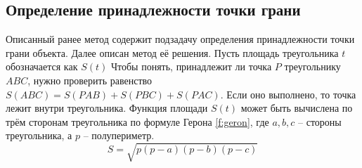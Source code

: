 {    \subsection{Определение принадлежности точки грани} {
        Описанный ранее метод содержит подзадачу определения
        принадлежности точки грани объекта.
        Далее описан метод её решения.
        Пусть площадь треугольника $t$ обозначается как $S(t)$
        Чтобы понять, принадлежит ли точка $P$ треугольнику $ABC$,
        нужно проверить равенство $S(ABC) = S(PAB) + S(PBC) + S(PAC)$.
        Если оно выполнено, то точка лежит внутри треугольника.
        Функция площади $S(t)$ может быть вычислена по трём сторонам
        треугольника по формуле Герона \ref{f:geron}, где $a, b, c$ -- стороны треугольника, а $p$ -- полупериметр.
        \begin{equation}
            \label{f:geron}
            S = \sqrt{p(p - a)(p - b)(p - c)}
        \end{equation}
    }
}

